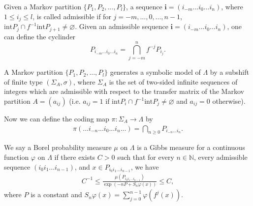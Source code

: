 \documentclass[11pt,a4paper]{amsart}
\theoremstyle{plain}
\newtheorem{Prop}[Thm]{Proposition}
\theoremstyle{remark}
\begin{document}
	Given a Markov partition $\{P_{1},P_{2},...,P_{l}\}$, a sequence $\mathbf{i}=(i_{-m}...i_{0}...i_{n})$, where $1\leq i_{j}\leq l$, is called admissible if for $j=-m,...,0,...,n-1$, $\text{int} P_{j}\cap f^{-1}\text{int} P_{j+1}\neq \varnothing$. Given an admissible sequence $\mathbf{i}=(i_{-m}...i_{0}...i_{n})$, one can define the cyclinder
	$$P_{i_{-m}...i_{0}...i_{n}}=\bigcap_{j=-m}^{n}f^{-j}P_{i_{j}}.$$
	
	A Markov partition $\{P_{1},P_{2},...,P_{l}\}$ generates a symbolic model of $\Lambda$ by a subshift of finite type $(\Sigma_{A},\sigma)$, where $\Sigma_{A}$ is the set of two-sided infinite sequences of integers which are admissible with respect to the transfer matrix of the Markov partition $A=(a_{ij})$ (i.e. $a_{ij}=1$ if $\text{int} P_{i}\cap f^{-1}\text{int} P_{j}\neq \varnothing$ and $a_{ij}=0$ otherwise).
	
	Now we can define the coding map $\pi:\Sigma_{A}\rightarrow \Lambda$ by
	\begin{align*}
		\pi(...i_{-n}...i_{0}...i_{n}...)=\bigcap_{n\geq 0}P_{i_{-n}...i_{n}}.
	\end{align*}
	
	We say a Borel probability measure $\mu$ on $\Lambda$ is a Gibbs measure for a continuous function $\varphi$ on $\Lambda$ if there exists $C>0$ such that for every $n\in \mathbb{N}$, every admissible sequence $(i_{0}i_{1}...i_{n-1})$, and $x\in P_{i_{0}i_{1}...i_{n-1}}$, we have
	\begin{align*}
		C^{-1}\leq \frac{\mu(P_{i_{0}i_{1}...i_{n-1}})}{\exp(-nP+S_{n}\varphi(x))}\leq C,
	\end{align*}
	where $P$ is a constant and $S_{n}\varphi(x)=\sum_{j=0}^{n-1}\varphi(f^{j}(x))$.
	\fi

\end{document}
